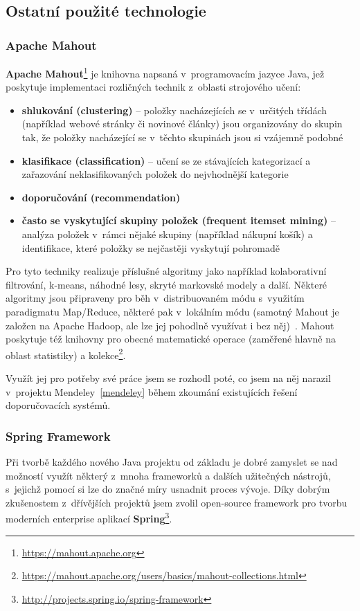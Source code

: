 \documentclass[thesis=M,czech]{FITthesis}[2014/05/07]
\begin{document}
\subsection{Ostatní použité technologie}

\subsubsection{Apache Mahout}
\label{mahout}
\textbf{Apache Mahout}\footnote{\url{https://mahout.apache.org}} je knihovna napsaná v~programovacím jazyce Java, jež poskytuje implementaci rozličných technik z~oblasti strojového učení:

\begin{itemize}
	\item \textbf{shlukování (clustering)} – položky nacházejících se v~určitých třídách (například webové stránky či novinové články) jsou organizovány do skupin tak, že položky nacházející se v~těchto skupinách jsou si vzájemně podobné
	\item \textbf{klasifikace (classification)} – učení se ze stávajících kategorizací a zařazování neklasifikovaných položek do nejvhodnější kategorie
	\item \textbf{doporučování (recommendation)}
	\item \textbf{často se vyskytující skupiny položek (frequent itemset mining)} – analýza položek v~rámci nějaké skupiny (například nákupní košík) a identifikace, které položky se nejčastěji vyskytují pohromadě
\end{itemize}

Pro tyto techniky realizuje příslušné algoritmy jako například kolaborativní filtrování, k-means, náhodné lesy, skryté markovské modely a další. Některé algoritmy jsou připraveny pro běh v~distribuovaném módu s~využitím paradigmatu Map/Reduce, některé pak v~lokálním módu (samotný Mahout je založen na Apache Hadoop, ale lze jej pohodlně využívat i bez něj)~\cite{mahouttut}. Mahout poskytuje též knihovny pro obecné matematické operace (zaměřené hlavně na oblast statistiky) a kolekce\footnote{\url{https://mahout.apache.org/users/basics/mahout-collections.html}}. 

Využít jej pro potřeby své práce jsem se rozhodl poté, co jsem na něj narazil v~projektu Mendeley~\ref{mendeley} během zkoumání existujících řešení doporučovacích systémů. 

\subsubsection{Spring Framework}
Při tvorbě každého nového Java projektu od základu je dobré zamyslet se nad možností využít některý z~mnoha frameworků a dalších užitečných nástrojů, s~jejichž pomocí si lze do značné míry usnadnit proces vývoje. Díky dobrým zkušenostem z~dřívějších projektů jsem zvolil open-source framework pro tvorbu moderních enterprise aplikací \textbf{Spring}\footnote{\url{http://projects.spring.io/spring-framework}}. 
\end{document}
